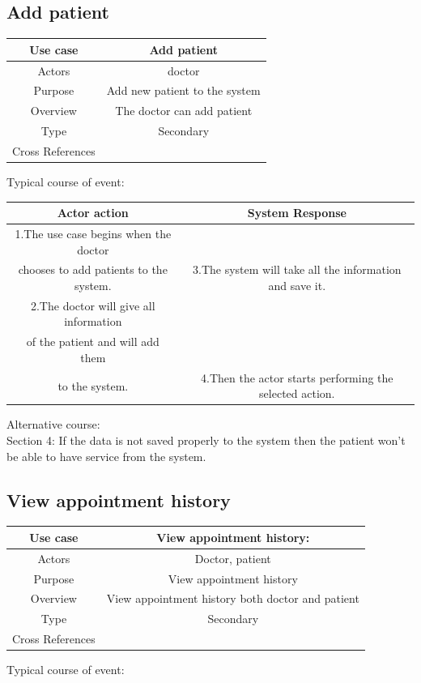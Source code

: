 \documentclass[14pt,a4paper,calibribody]{article}
\begin{document}
\subsection{Add patient}
\begin{center}
\begin{tabular}{ |c| c| }
\hline
Use case & Add patient  \\ 
\hline
Actors & doctor\\  
\hline
Purpose & Add new patient to the system \\ 
\hline
Overview & The doctor can add patient \\ 
\hline
Type & Secondary  \\ 
\hline
Cross References &  \\ 
\hline
\end{tabular}
\end{center}
Typical course of event:

\begin{center}
\begin{tabular}{ |c| c| }
\hline
Actor action & System Response \\ 
\hline
1.The use case begins when the doctor\\ chooses to add patients to the system. & 3.The system will take all the information and save it. \\  
\hline
2.The doctor will give all information\\ of the patient and will add them\\ to the system. & 4.Then the actor starts performing the selected action.\\  
 \hline
\end{tabular}
\end{center}
Alternative course:\\
Section 4: If the data is not saved properly to the system then the patient won’t be able to have service from the system.
\clearpage
\subsection{View appointment history}
\begin{center}
\begin{tabular}{ |c| c| }
\hline
Use case & View appointment history: \\ 
\hline
Actors & Doctor, patient\\  
\hline
Purpose & View appointment history  \\ 
\hline
Overview & View appointment history both doctor and patient \\ 
\hline
Type & Secondary \\ 
\hline
Cross References &  \\ 
\hline
\end{tabular}
\end{center}
Typical course of event:
\end{document}
